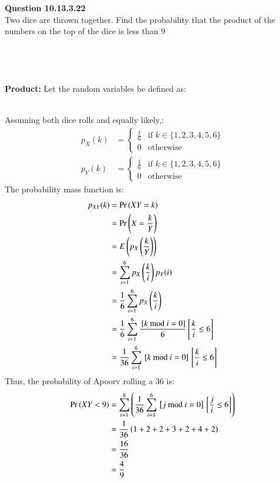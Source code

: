 \documentclass[journal,12pt,twocolumn]{IEEEtran}
\begin{document}
\vspace{3cm}
 
\textbf{Question 10.13.3.22}\\
Two dice are thrown together. Find the probability that the product of the numbers on the top of the dice is less than 9\\ \\ \\
\fi
\solution \\ \\
 \textbf{Product:} Let the random variables be defined as:
\begin{table}[!ht]

\end{table} \\
Assuming both dice rolls and equally likely,:
    \begin{align}
        p_X(k) &= 
        \begin{cases}
            \frac{1}{6} & \text{if }k \in \{1, 2, 3, 4, 5, 6\}\\
            0 & \text{otherwise}
        \end{cases}\label{eq:1}\\
        p_Y(k) &=
        \begin{cases}
            \frac{1}{6} & \text{if }k \in \{1, 2, 3, 4, 5, 6\}\\
            0 & \text{otherwise}
        \end{cases}
    \end{align}
    The probability mass function is:
    \begin{align}
        p_{XY}(k) &= \Pr\left(XY = k\right)\\
        &= \Pr\left(X = \frac{k}{Y}\right)\\
        &= E\left(p_X\left(\frac{k}{Y}\right)\right)\\
        &= \sum_{i = 1}^{6} p_X\left(\frac{k}{i}\right) p_Y(i)\\
        &= \frac{1}{6} \sum_{i = 1}^{6} p_X\left(\frac{k}{i}\right)\\
        &= \frac{1}{6} \sum_{i = 1}^{6} \frac{{}\left[k \text{ mod } i = 0\right]}{6}{}\left[\frac{k}{i} \leq 6\right]\\
        &= \frac{1}{36} \sum_{i = 1}^{6} {}\left[k \text{ mod } i = 0\right]{}\left[\frac{k}{i} \leq 6\right]
    \end{align}
Thus, the probability of Apoorv rolling a 36 is:
    \begin{align}
    \Pr\left(XY < 9\right) &= \sum_{i = 1}^{8}\left(\frac{1}{36}\sum_{i = 1}^{6} {}\left[j \text{ mod } i = 0\right]{}\left[\frac{j}{i} \leq 6\right]\right) \\
    &= \frac{1}{36} \left( 1 + 2 + 2 + 3 + 2 + 4 + 2 \right) \\
    &= \frac{16}{36} \\
    &= \frac{4}{9} 
  \end{align}
\end{document}
